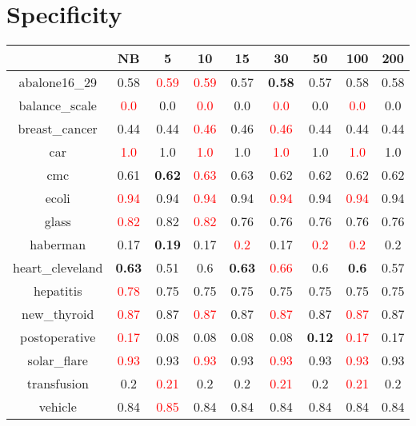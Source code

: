 \documentclass{article}%
\begin{document}
\section*{Specificity}%
\begin{tabular}{c|cccccccc}%
\hline%
&NB&5&10&15&30&50&100&200\\%
\hline%
abalone16\_29&0.58&\textcolor{red}{ 
0.59
}&\textcolor{red}{ 
0.59
}&0.57&\textbf{0.58}&0.57&0.58&0.58\\%
\hline%
balance\_scale&\textcolor{red}{ 
0.0
}&0.0&\textcolor{red}{ 
0.0
}&0.0&\textcolor{red}{ 
0.0
}&0.0&\textcolor{red}{ 
0.0
}&0.0\\%
\hline%
breast\_cancer&0.44&0.44&\textcolor{red}{ 
0.46
}&0.46&\textcolor{red}{ 
0.46
}&0.44&0.44&0.44\\%
\hline%
car&\textcolor{red}{ 
1.0
}&1.0&\textcolor{red}{ 
1.0
}&1.0&\textcolor{red}{ 
1.0
}&1.0&\textcolor{red}{ 
1.0
}&1.0\\%
\hline%
cmc&0.61&\textbf{0.62}&\textcolor{red}{ 
0.63
}&0.63&0.62&0.62&0.62&0.62\\%
\hline%
ecoli&\textcolor{red}{ 
0.94
}&0.94&\textcolor{red}{ 
0.94
}&0.94&\textcolor{red}{ 
0.94
}&0.94&\textcolor{red}{ 
0.94
}&0.94\\%
\hline%
glass&\textcolor{red}{ 
0.82
}&0.82&\textcolor{red}{ 
0.82
}&0.76&0.76&0.76&0.76&0.76\\%
\hline%
haberman&0.17&\textbf{0.19}&0.17&\textcolor{red}{ 
0.2
}&0.17&\textcolor{red}{ 
0.2
}&\textcolor{red}{ 
0.2
}&0.2\\%
\hline%
heart\_cleveland&\textbf{0.63}&0.51&0.6&\textbf{0.63}&\textcolor{red}{ 
0.66
}&0.6&\textbf{0.6}&0.57\\%
\hline%
hepatitis&\textcolor{red}{ 
0.78
}&0.75&0.75&0.75&0.75&0.75&0.75&0.75\\%
\hline%
new\_thyroid&\textcolor{red}{ 
0.87
}&0.87&\textcolor{red}{ 
0.87
}&0.87&\textcolor{red}{ 
0.87
}&0.87&\textcolor{red}{ 
0.87
}&0.87\\%
\hline%
postoperative&\textcolor{red}{ 
0.17
}&0.08&0.08&0.08&0.08&\textbf{0.12}&\textcolor{red}{ 
0.17
}&0.17\\%
\hline%
solar\_flare&\textcolor{red}{ 
0.93
}&0.93&\textcolor{red}{ 
0.93
}&0.93&\textcolor{red}{ 
0.93
}&0.93&\textcolor{red}{ 
0.93
}&0.93\\%
\hline%
transfusion&0.2&\textcolor{red}{ 
0.21
}&0.2&0.2&\textcolor{red}{ 
0.21
}&0.2&\textcolor{red}{ 
0.21
}&0.2\\%
\hline%
vehicle&0.84&\textcolor{red}{ 
0.85
}&0.84&0.84&0.84&0.84&0.84&0.84\\%

\end{tabular}
\end{document}
